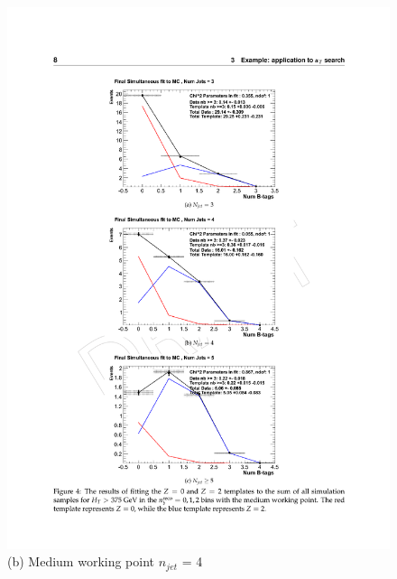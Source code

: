 \begin{figure}[ht]
\begin{minipage}[b]{0.55\linewidth}
\includegraphics[width = 1.0\linewidth]{plots/template_mc_medium_njet4.pdf}
\centering (b) Medium working point $n_{jet}$ = 4 
\end{minipage}
\quad
\begin{minipage}[b]{0.55\linewidth}
\centering

\end{minipage}
\end{figure}

